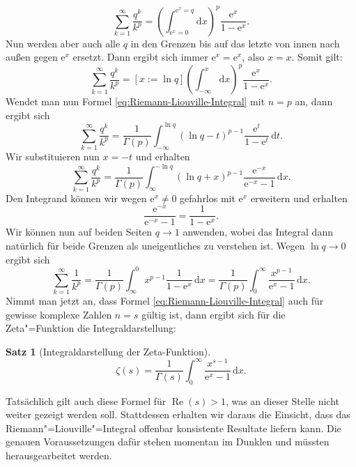 \documentclass[a4paper,10pt,fleqn,twocolumn,twoside]{scrartcl}
\numberwithin{equation}{section}
\newcommand{\ee}{\mathrm e}
\DeclareMathOperator{\real}{Re}
\theoremstyle{rmbox}
\newtheorem{theorem}{Satz}
\begin{document}
\begin{equation}
\sum_{k=1}^\infty \frac{q^k}{k^p}
= \left(\int_{\ee^x=0}^{\ee^x=q} \mathrm dx\right)^p \frac{\ee^x}{1-\ee^x}.
\end{equation}
Nun werden aber auch alle $q$ in den Grenzen bis auf das letzte
von innen nach außen gegen $\ee^x$ ersetzt. Dann ergibt sich
immer $\ee^x=\ee^x$, also $x=x$. Somit gilt:%
\begin{equation}
\sum_{k=1}^\infty \frac{q^k}{k^p}
= [x:=\ln q]\left(\int_{-\infty}^{x} \mathrm dx\right)^p \frac{\ee^x}{1-\ee^x}.
\end{equation}
Wendet man nun Formel \eqref{eq:Riemann-Liouville-Integral}
mit $n=p$ an, dann ergibt sich%
\begin{equation}
\sum_{k=1}^\infty \frac{q^k}{k^p}
= \frac{1}{\Gamma(p)}\int_{-\infty}^{\ln q} (\ln q-t)^{p-1}\frac{\ee^t}{1-\ee^t}\,\mathrm dt.
\end{equation}
Wir substituieren nun $x=-t$ und erhalten
\begin{equation}
\sum_{k=1}^\infty \frac{q^k}{k^p}
= \frac{1}{\Gamma(p)}\int_{\infty}^{-\ln q} (\ln q+x)^{p-1}\frac{\ee^{-x}}{\ee^{-x}-1}\,\mathrm dx.
\end{equation}
Den Integrand können wir wegen $\ee^x\ne 0$ gefahrlos mit $\ee^x$
erweitern und erhalten%
\begin{equation}
\frac{\ee^{-x}}{\ee^{-x}-1} = \frac{1}{1-\ee^x}.
\end{equation}
Wir können nun auf beiden Seiten $q\to 1$ anwenden, wobei das Integral
dann natürlich für beide Grenzen als uneigentliches zu verstehen
ist. Wegen $\ln q\to 0$ ergibt sich%
\begin{equation}
\sum_{k=1}^\infty \frac{1}{k^p}
= \frac{1}{\Gamma(p)}\int_{\infty}^0 x^{p-1}\frac{1}{1-\ee^x}\,\mathrm dx
= \frac{1}{\Gamma(p)}\int_0^\infty \frac{x^{p-1}}{\ee^x-1}\,\mathrm dx.
\end{equation}
Nimmt man jetzt an, dass Formel \eqref{eq:Riemann-Liouville-Integral}
auch für gewisse komplexe Zahlen $n=s$ gültig ist, dann ergibt sich
für die Zeta"=Funktion die Integraldarstellung:%
\begin{theorem}[Integraldarstellung der Zeta-Funktion]
\begin{equation}
\zeta(s) = \frac{1}{\Gamma(s)}\int_0^\infty \frac{x^{s-1}}{\ee^x-1}\,\mathrm dx.
\end{equation}
\end{theorem}
Tatsächlich gilt auch diese Formel für $\real(s)>1$, was an dieser
Stelle nicht weiter gezeigt werden soll. Stattdessen erhalten wir
daraus die Einsicht, dass das Riemann"=Liouville"=Integral offenbar
konsistente Resultate liefern kann. Die genauen Voraussetzungen dafür
stehen momentan im Dunklen und müssten herausgearbeitet werden.
\end{document}

